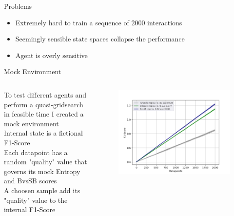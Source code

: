 \documentclass[aspectratio=169, 11pt, invertlogo]{ismll-slides}
\begin{document}


\begin{frame}[fragile]{Problems}
	\begin{itemize}
		\item Extremely hard to train a sequence of 2000 interactions
		\item Seemingly sensible state spaces collapse the performance
		\item Agent is overly sensitive
	\end{itemize}
\end{frame}




\begin{frame}[fragile]{Mock Environment}
	\begin{columns}
		\begin{column}{.6\linewidth}
			To test different agents and perform a quasi-gridsearch in feasible time I created a mock environment \\ [1mm]
			Internal state is a fictional F1-Score \\ [1mm]
			Each datapoint has a random "quality" value that governs its mock Entropy and BvsSB scores \\ [1mm]
			A choosen sample add its "quality" value to the internal F1-Score 
		\end{column}
		\begin{column}{.4\linewidth}
			\begin{figure}
				\centering
				\includegraphics[width=\linewidth]{pics/eval_mock}
			\end{figure}
		\end{column}
	\end{columns}
\end{frame}
\end{document}

